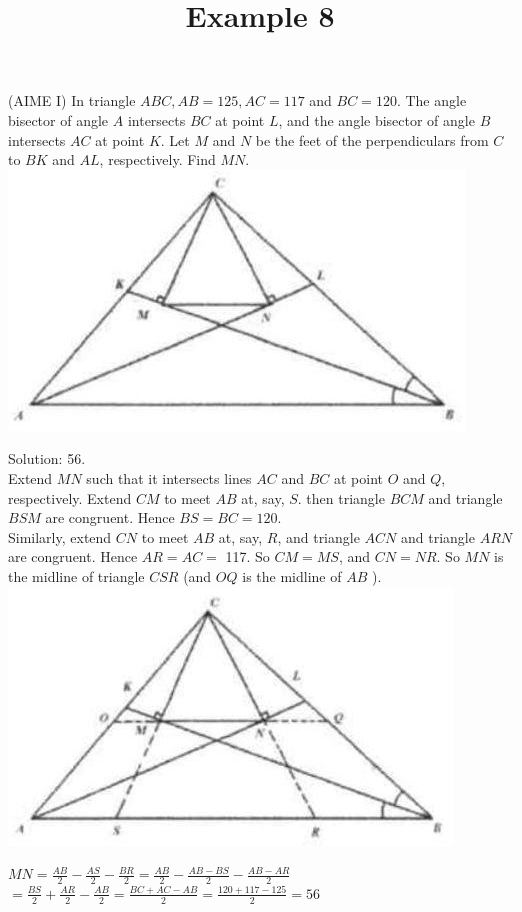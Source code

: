 \documentclass{article}
\title{Example 8}
\date{}
\begin{document}
\maketitle

(AIME I) In triangle \(A B C, A B=125, A C=117\) and \(B C=120\). The angle bisector of angle \(A\) intersects \(B C\) at point \(L\), and the angle bisector of angle \(B\) intersects \(A C\) at point \(K\). Let \(M\) and \(N\) be the feet of the perpendiculars from \(C\) to \(B K\) and \(A L\), respectively. Find \(M N\).\\
\centering
\includegraphics[width=\textwidth]{images/problem_image_1.jpg}

Solution: 56.\\
Extend \(M N\) such that it intersects lines \(A C\) and \(B C\) at point \(O\) and \(Q\), respectively. Extend \(C M\) to meet \(A B\) at, say, \(S\). then triangle \(B C M\) and triangle \(B S M\) are congruent. Hence \(B S=B C=120\).\\
Similarly, extend \(C N\) to meet \(A B\) at, say, \(R\), and triangle \(A C N\) and triangle \(A R N\) are congruent. Hence \(A R=A C=\) 117. So \(C M=M S\), and \(C N=N R\). So \(M N\) is the midline of triangle \(C S R\) (and \(O Q\) is the midline of \(A B\) ).\\
\centering
\includegraphics[width=\textwidth]{images/reasoning_image_1.jpg}

\(M N=\frac{A B}{2}-\frac{A S}{2}-\frac{B R}{2}=\frac{A B}{2}-\frac{A B-B S}{2}-\frac{A B-A R}{2}\)\\
\(=\frac{B S}{2}+\frac{A R}{2}-\frac{A B}{2}=\frac{B C+A C-A B}{2}=\frac{120+117-125}{2}=56\)
\end{document}
